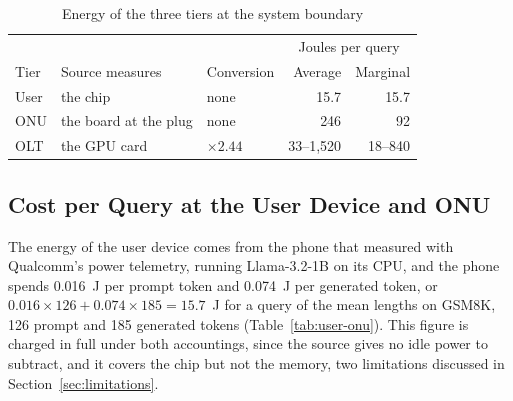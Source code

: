 \documentclass[cic,dipl,english]{infufrgs}
\begin{document}
\begin{table}[htb]
  \centering
  \caption{Energy of the three tiers at the system boundary}
  \label{tab:energy}
  \begin{tabular}{lllrr}
    \toprule
    & & & \multicolumn{2}{c}{Joules per query} \\
    Tier & Source measures & Conversion & Average & Marginal \\
    \midrule
    User & the chip & none & 15.7 & 15.7 \\
    ONU & the board at the plug & none & 246 & 92 \\
    OLT & the GPU card & $\times 2.44$ & 33--1,520 & 18--840 \\
    \bottomrule
  \end{tabular}
\end{table}

\subsection{Cost per Query at the User Device and ONU}
\label{sec:user-onu-energy}

The energy of the user device comes from the phone that  measured
with Qualcomm's power telemetry, running Llama-3.2-1B on its CPU, and the phone spends
0.016~J per prompt token and 0.074~J per generated token, or
$0.016 \times 126 + 0.074 \times 185 = 15.7$~J for a query of the mean lengths on GSM8K,
126 prompt and 185 generated tokens (Table~\ref{tab:user-onu}). This figure is charged in full under both accountings, since
the source gives no idle power to subtract, and it covers the chip but not the memory, two
limitations discussed in Section~\ref{sec:limitations}.
\end{document}
